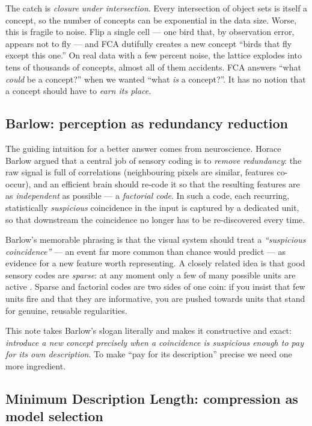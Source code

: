 \documentclass[11pt]{article}
\begin{document}
The catch is \emph{closure under intersection}. Every intersection of object
sets is itself a concept, so the number of concepts can be exponential in the
data size. Worse, this is fragile to noise. Flip a single cell --- one bird
that, by observation error, appears not to fly --- and FCA dutifully creates a
new concept ``birds that fly except this one.'' On real data with a few percent
noise, the lattice explodes into tens of thousands of concepts, almost all of
them accidents. FCA answers ``what \emph{could} be a concept?'' when we wanted
``what \emph{is} a concept?''. It has no notion that a concept should have to
\emph{earn its place}.

\subsection{Barlow: perception as redundancy reduction}

The guiding intuition for a better answer comes from neuroscience. Horace Barlow
argued \cite{barlow1961,barlow1989} that a central job of sensory coding is to
\emph{remove redundancy}: the raw signal is full of correlations (neighbouring
pixels are similar, features co-occur), and an efficient brain should re-code it
so that the resulting features are as \emph{independent} as possible --- a
\emph{factorial code}. In such a code, each recurring, statistically
\emph{suspicious} coincidence in the input is captured by a dedicated unit, so
that downstream the coincidence no longer has to be re-discovered every time.

Barlow's memorable phrasing is that the visual system should treat a
\emph{``suspicious coincidence''} --- an event far more common than chance would
predict --- as evidence for a new feature worth representing. A closely related
idea is that good sensory codes are \emph{sparse}: at any moment only a few of
many possible units are active \cite{barlow1972,foldiak1990,foldiak1995,
olshausen1996}. Sparse and factorial codes are two sides of one coin: if you
insist that few units fire and that they are informative, you are pushed towards
units that stand for genuine, reusable regularities.

This note takes Barlow's slogan literally and makes it constructive and exact:
\emph{introduce a new concept precisely when a coincidence is suspicious enough
to pay for its own description}. To make ``pay for its description'' precise we
need one more ingredient.

\subsection{Minimum Description Length: compression as model selection}
\end{document}
